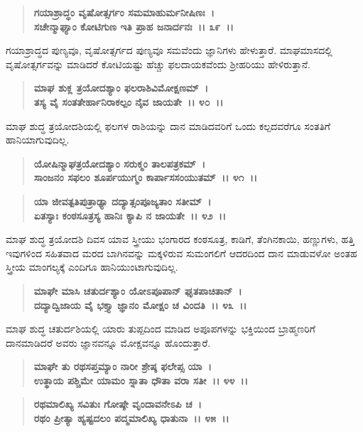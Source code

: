 \begin{verse}
\textbf{ಗಯಾಶ್ರಾದ್ಧಂ ವೃಷೋತ್ಸರ್ಗಂ ಸಮಮಾಹುರ್ಮನೀಷಿಣಃ~।}\\\textbf{ಸಚೇನ್ಮಾಘ್ಯಾಂ ಕೋಟಿಗುಣ ಇತಿ ಪ್ರಾಹ ಜನಾರ್ದನಃ~।। ೩೯~।।}
\end{verse}

ಗಯಾಶ್ರಾದ್ಧದ ಪುಣ್ಯವೂ, ವೃಷೋತ್ಸರ್ಗದ ಪುಣ್ಯವೂ ಸಮವೆಂದು ಜ್ಞಾನಿಗಳು ಹೇಳು\-ತ್ತಾರೆ. ಮಾಘಮಾಸದಲ್ಲಿ ವೃಷೋತ್ಸರ್ಗವನ್ನು ಮಾಡಿದರೆ ಕೋಟಿಯಷ್ಟು ಹೆಚ್ಚು ಫಲದಾಯಕವೆಂದು ಶ‍್ರೀಹರಿಯು ಹೇಳಿರುತ್ತಾನೆ.

\begin{verse}
\textbf{ಮಾಘ ಶುಕ್ಲ ತ್ರಯೋದಶ್ಯಾಂ ಫಲರಾಶಿವಿಮೋಕ್ಷಣಮ್~।}\\\textbf{ತಸ್ಯ ವೈ ಸಂತತೇರ್ಹಾನಿರಾಕಲ್ಪಂ ನೈವ ಜಾಯತೇ~।। ೪೦~।। }
\end{verse}

ಮಾಘ ಶುದ್ಧ ತ್ರಯೋದಶಿಯಲ್ಲಿ ಫಲಗಳ ರಾಶಿಯನ್ನು ದಾನ ಮಾಡಿದವರಿಗೆ ಒಂದು ಕಲ್ಪದವರೆಗೂ ಸಂತತಿಗೆ ಹಾನಿಯಾಗುವುದಿಲ್ಲ.

\begin{verse}
\textbf{ಯೋಷಿನ್ಮಾಘತ್ರಯೋದಶ್ಯಾಂ ಸರುಕ್ಮಂ ತಾಲಪತ್ರಕಮ್~।}\\\textbf{ಸಾಂಜನಂ ಸಫಲಂ ಶೂರ್ಪಯುಗ್ಮಂ ಕಾರ್ಪಾಸಸಂಯುತಮ್~।। ೪೧~।। }
\end{verse}

\begin{verse}
\textbf{ಯಾ ಜೀವತ್ಪತಿಪುತ್ರಾಢ್ಯಾ ದದ್ಯಾತ್ಸಂಪೂಜ್ಯತಾಂ ಸತೀಮ್~।}\\\textbf{ಏತಸ್ಯಾಃ ಕಂಠಸೂತ್ರಸ್ಯ ಹಾನಿಃ ಕ್ಯಾಪಿ ನ ಜಾಯತೇ~।। ೪೨~।।}
\end{verse}

ಮಾಘ ಶುದ್ಧ ತ್ರಯೋದಶಿ ದಿವಸ ಯಾವ ಸ್ತ್ರೀಯು ಭಂಗಾರದ ಕಂಠಸೂತ್ರ, ಕಾಡಿಗೆ, ತೆಂಗಿನಕಾಯಿ, ಹಣ್ಣುಗಳು, ಹತ್ತಿ ಇವುಗಳಿಂದ ಸಹಿತವಾದ ಮರದ ಬಾಗಿನವನ್ನು ಮಕ್ಕಳಿರುವ ಸುಮಂಗಲಿಗೆ ಆದರದಿಂದ ದಾನ ಮಾಡುವಳೋ ಅಂತಹ ಸ್ತ್ರೀಯ ಮಾಂಗಲ್ಯಕ್ಕೆ ಎಂದಿಗೂ ಹಾನಿಯುಂಟಾಗುವುದಿಲ್ಲ.

\begin{verse}
\textbf{ಮಾಘೇ ಮಾಸಿ ಚತುರ್ದಶ್ಯಾಂ ಯೋಽಪೂಪಾನ್ ಘೃತಪಾಚಿತಾನ್~।}\\\textbf{ದದ್ಯಾದ್ವಿಜಾಯ ವೈ ಭಕ್ತ್ಯಾ ಜ್ಞಾನಂ ಮೋಕ್ಷಂ ಚ ವಿಂದತಿ~।। ೪೩~।।}
\end{verse}

ಮಾಘ ಶುದ್ಧ ಚತುರ್ದಶಿಯಲ್ಲಿ ಯಾರು ತುಪ್ಪದಿಂದ ಮಾಡಿದ ಅಪೂಪಗಳನ್ನು ಭಕ್ತಿಯಿಂದ ಬ್ರಾಹ್ಮಣರಿಗೆ ದಾನಮಾಡಿದರೆ ಅವರು ಜ್ಞಾನವನ್ನೂ ಮೋಕ್ಷವನ್ನೂ ಹೊಂದುತ್ತಾರೆ.

\begin{verse}
\textbf{ಮಾಘೇ ತು ರಥಸಪ್ತಮ್ಯಾಂ ನಾರೀ ಶ್ರೇಷ್ಠ ಫಲೇಪ್ಸ ಯಾ~।}\\\textbf{ಉತ್ಥಾಯ ಪಶ್ಚಿಮೇ ಯಾಮಂ ಸ್ನಾತಾ ಧೌತಾ ವರಾ ಸತೀ~।। ೪೪~।। }
\end{verse}

\begin{verse}
\textbf{ರಥಮಾಲಿಖ್ಯ ಸವಿತುಃ ಗೋಷ್ಠೇ ವೃಂದಾವನೇಽಪಿ ಚ~।}\\\textbf{ರಥಂ ಪ್ರೀತ್ಯಾ ಹ್ಯಷ್ಟದಲಂ ಪದ್ಮಮಾಲಿಖ್ಯ ಧಾತುನಾ~।। ೪೫~।। }
\end{verse}

